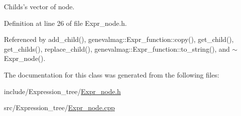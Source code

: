 Childs's vector of node. 



Definition at line 26 of file Expr\_\-node.h.

Referenced by add\_\-child(), genevalmag::Expr\_\-function::copy(), get\_\-child(), get\_\-childs(), replace\_\-child(), genevalmag::Expr\_\-function::to\_\-string(), and $\sim$Expr\_\-node().

The documentation for this class was generated from the following files:\begin{CompactItemize}
\item 
include/Expression\_\-tree/\hyperlink{Expr__node_8h}{Expr\_\-node.h}\item 
src/Expression\_\-tree/\hyperlink{Expr__node_8cpp}{Expr\_\-node.cpp}\end{CompactItemize}
